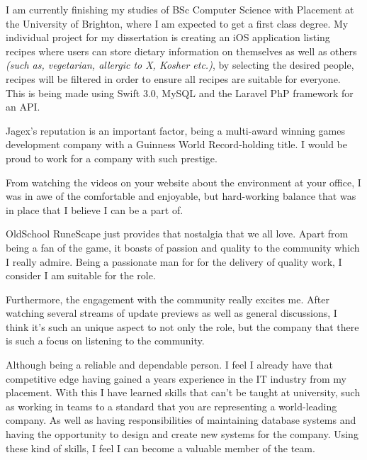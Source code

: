 \documentclass[11pt, a4paper]{awesome-cv}
\begin{document}
\makecvheader

\makelettertitle

\begin{cvletter}
I am currently finishing my studies of BSc Computer Science with Placement at the University of Brighton, where I am expected to get a first class degree. My individual project for my dissertation is creating an iOS application listing recipes where users can store dietary information on themselves as well as others \textit{(such as, vegetarian, allergic to X, Kosher etc.)}, by selecting the desired people, recipes will be filtered in order to ensure all recipes are suitable for everyone. This is being made using Swift 3.0, MySQL and the Laravel PhP framework for an API.

Jagex's reputation is an important factor, being a multi-award winning games development company with a Guinness World Record-holding title. I would be proud to work for a company with such prestige.

From watching the videos on your website about the environment at your office, I was in awe of the comfortable and enjoyable, but hard-working balance that was in place that I believe I can be a part of. 

OldSchool RuneScape just provides that nostalgia that we all love. Apart from being a fan of the game, it boasts of passion and quality to the community which I really admire. Being a passionate man for for the delivery of quality work, I consider I am suitable for the role.

Furthermore, the engagement with the community really excites me. After watching several streams of update previews as well as general discussions, I think it's such an unique aspect to not only the role, but the company that there is such a focus on listening to the community.

Although being a reliable and dependable person. I feel I already have that competitive edge having gained a years experience in the IT industry from my placement. With this I have learned skills that can't be taught at university, such as working in teams to a standard that you are representing a world-leading company. As well as having responsibilities of maintaining database systems and having the opportunity to design and create new systems for the company. Using these kind of skills, I feel I can become a valuable member of the team.

\end{cvletter}

\makeletterclosing
\end{document}
